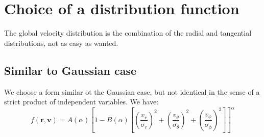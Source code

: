 \section{Choice of a distribution function}
\label{sec:choice_of_a_distribution_function}

The global velocity distribution is the combination of the radial and
tangential distributions, not as easy as wanted.

\subsection{Similar to Gaussian case}
\label{sub:similar_to_gaussian_case}

We choose a form similar ot the Gaussian case, but not identical in the
sense of a strict product of independent variables. We have:
%
\begin{equation}
    f\left(\textbf{r},\textbf{v}\right)=
    A\left(\alpha\right)
    {\left[1-B\left(\alpha\right)\left[
                {\left(\frac{v_r}{\sigma_r}\right)}^2+
                {\left(\frac{v_{\theta}}{\sigma_{\theta}}\right)}^2+
                {\left(\frac{v_{\phi}}{\sigma_{\phi}}\right)}^2
    \right]\right]}^\alpha
\end{equation}
%

